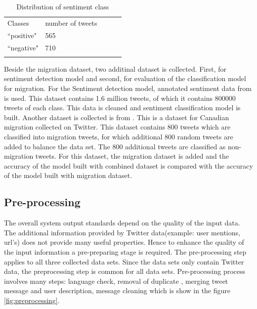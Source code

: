 \begin{table}[]
\centering
\begin{tabular}{lllll}
\cline{1-2}
\multicolumn{1}{|l|}{Classes}   & \multicolumn{1}{l|}{number of tweets} &  &  &  \\ \cline{1-2}
\multicolumn{1}{|l|}{``positive"} & \multicolumn{1}{l|}{565}  &  &  &  \\ \cline{1-2}
\multicolumn{1}{|l|}{``negative"}   & \multicolumn{1}{l|}{710}  &  &  &  \\ \cline{1-2}
                            &                           &  &  & 
\label{tab:Distribution of sentiment class}
\end{tabular}
\caption{Distribution of sentiment class}
\label{tab:DistsentimentClass}
\end{table}

Beside the migration dataset, two additinal dataset is collected. First, for sentiment detection model and second, for evaluation of the classification model for migration. For the Sentiment detection model, annotated sentiment data from \cite{stanford_data} is used. This dataset contains 1.6 million tweets, of which it contains  800000 tweets of each class. This data is cleaned and sentiment classification model is built. Another dataset is collected is from \cite{CanadianmMigrationDataset}. This is a dataset for Canadian migration collected on Twitter. This dataset contains 800 tweets which are classified into migration tweets, for which additional 800 random tweets are added to balance the data set. The 800 additional tweets are classified as non-migration tweets. For this dataset, the migration dataset is added and the accuracy of the model built with combined dataset is compared with the accuracy of the model built with migration dataset. 



\subsection{Pre-processing}
The overall system output standards depend on the quality of the input data. The additional information provided by Twitter data(example: user mentions, url's) does not provide many useful properties. Hence to enhance the quality  of the input information a pre-preparing stage is required. The pre-processing step applies to all three collected data sets. Since the data sets only contain Twitter data, the preprocessing step is common for all data sets. Pre-processing process involves many steps: language check, removal of duplicate , merging tweet message and user description, message cleaning which is show in the figure \ref{fig:preprocessing}. 

